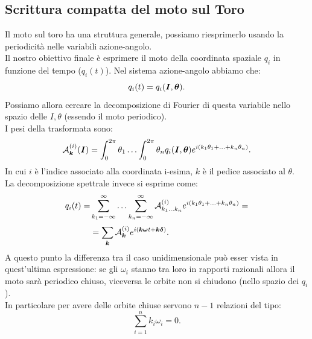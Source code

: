 \subsection{Scrittura compatta del moto sul Toro}%
\label{sub:Scrittura compatta del moto sul Toro}
Il moto sul toro ha una struttura generale, possiamo riesprimerlo usando la periodicità nelle variabili azione-angolo.\\
Il nostro obiettivo finale è esprimere il moto della coordinata spaziale $q_i$ in funzione del tempo ($q_i(t)$). Nel sistema azione-angolo abbiamo che:
\[
    q_i(t) = q_i(\boldsymbol{I}, \boldsymbol{\theta}) 
.\] 
Possiamo allora cercare la decomposizione di Fourier di questa variabile nello spazio delle $I, \theta$ (essendo il moto periodico). \\
I pesi della trasformata sono:
\[
    \mathcal{A}_{\boldsymbol{k}}^{(i)}(\boldsymbol{I}) = \int_{0}^{2\pi} \theta_1 \ldots \int_{0}^{2\pi} \theta_n q_i(\boldsymbol{I}, \boldsymbol{\theta})e^{i(k_1\theta_1+ \ldots + k_n\theta_n) }   
.\] 
In cui $i$ è l'indice associato alla coordinata i-esima, $k$ è il pedice associato al $\theta$. \\
La decomposizione spettrale invece si esprime come:
\[\begin{aligned}
    q_i(t) = & \sum_{k_1=-\infty}^{\infty} \ldots\sum_{k_n = -\infty}^{\infty} \mathcal{A}_{k_1\ldots k_n}^{(i)} e^{i(k_1\theta_1+\ldots+k_n\theta_n)} =\\
	     & = \sum_{\boldsymbol{k}}^{} \mathcal{A}_{\boldsymbol{k}}^{(i)}e^{i(\boldsymbol{k}\boldsymbol{\omega} t + \boldsymbol{k}\boldsymbol{\delta}) }
.\end{aligned}\]
A questo punto la differenza tra il caso unidimensionale può esser vista in quest'ultima espressione: se gli $\omega_i$ stanno tra loro in rapporti razionali allora il moto sarà periodico chiuso, viceversa le orbite non si chiudono (nello spazio dei $q_i$).\\
In particolare per avere delle orbite chiuse servono $n-1$ relazioni del tipo:
\[
    \sum_{i=1}^{n} k_i\omega_i = 0
.\] 
\clearpage

